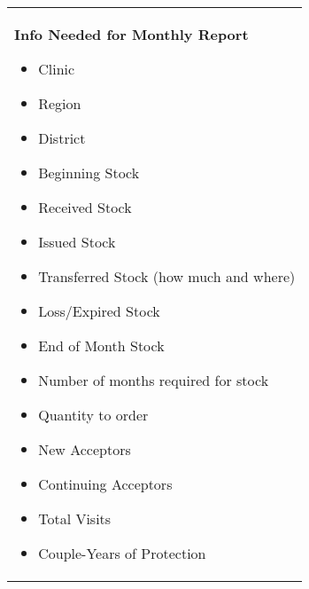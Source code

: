 \documentclass{article}
\begin{document}
\pagebreak

\begin{longtable}{| p{15cm} |}
    \hline
    \centering \textbf{Info Needed for Monthly Report}
    \hline
    \begin{itemize}
        \item Clinic
        \item Region
        \item District
        \item Beginning Stock
        \item Received Stock
        \item Issued Stock
        \item Transferred Stock (how much and where)
        \item Loss/Expired Stock
        \item End of Month Stock
        \item Number of months required for stock
        \item Quantity to order
        \item New Acceptors
        \item Continuing Acceptors
        \item Total Visits
        \item Couple-Years of Protection
    \end{itemize} 
    \hline
\end{longtable}
\end{document}
